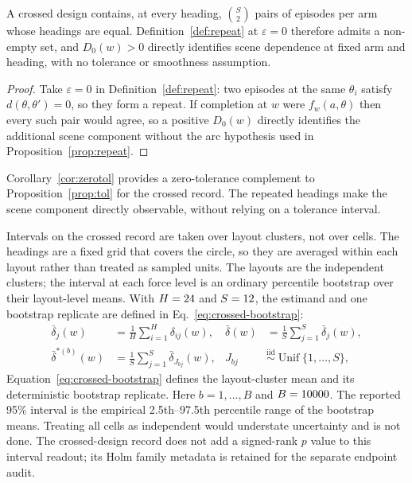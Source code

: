 \begin{corollary}\label{cor:zerotol}
A crossed design contains, at every heading, $\binom{S}{2}$ pairs of episodes
per arm whose headings are equal. Definition~\ref{def:repeat} at
$\varepsilon = 0$ therefore admits a non-empty set, and $D_0(w)>0$ directly
identifies scene dependence at fixed arm and heading, with no tolerance or
smoothness assumption.
\end{corollary}

\begin{proof}
Take $\varepsilon=0$ in Definition~\ref{def:repeat}: two episodes at the same
$\theta_i$ satisfy $d(\theta,\theta')=0$, so they form a repeat. If completion
at $w$ were $f_w(a,\theta)$ then every such pair would agree, so a positive
$D_0(w)$ directly identifies the additional scene component without the arc
hypothesis used in Proposition~\ref{prop:repeat}.
\end{proof}

Corollary~\ref{cor:zerotol} provides a zero-tolerance complement to
Proposition~\ref{prop:tol} for the crossed record. The repeated headings make the
scene component directly observable, without relying on a tolerance interval.

Intervals on the crossed record are taken over layout clusters, not over cells. The
\NAssignedHeadings{} headings are a fixed grid that covers the circle, so they
are averaged within each layout rather than treated as sampled units. The
\NCrossedClusters{} layouts are the independent clusters; the interval at each
force level is an ordinary percentile bootstrap over their layout-level means.
With $H=24{}$ and $S=12{}$, the estimand and one
bootstrap replicate are defined in Eq.~\eqref{eq:crossed-bootstrap}:
\begin{equation}
  \begin{aligned}
  \bar\delta_j(w)&=\frac{1}{H}\sum_{i=1}^{H}\delta_{ij}(w),&
  \bar\delta(w)&=\frac{1}{S}\sum_{j=1}^{S}\bar\delta_j(w),\\
  \bar\delta^{*(b)}(w)&=\frac{1}{S}\sum_{j=1}^{S}\bar\delta_{J_{bj}}(w),&
  J_{bj}&\stackrel{\mathrm{iid}}{\sim}\operatorname{Unif}\{1,\ldots,S\},
  \end{aligned}
  \label{eq:crossed-bootstrap}
\end{equation}
Equation~\eqref{eq:crossed-bootstrap} defines the layout-cluster mean and its
deterministic bootstrap replicate. Here $b=1,\ldots,B$ and $B=10000{}$. The reported 95\% interval
is the empirical 2.5th--97.5th percentile range of the bootstrap means. Treating
all \NPairsPerForce{} cells as independent would understate uncertainty and is
not done. The crossed-design record does not add a signed-rank $p$ value to this
interval readout; its Holm family metadata is retained for the separate endpoint
audit.

